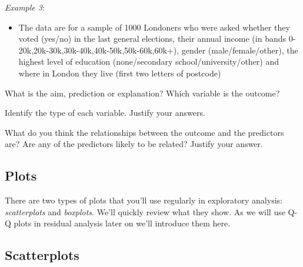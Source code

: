 \documentclass[
]{gitbook}
\providecommand{\tightlist}{%
  \setlength{\itemsep}{0pt}\setlength{\parskip}{0pt}}
\begin{document}
\newpage

\emph{Example 3}:

\begin{itemize}
\tightlist
\item
  The data are for a sample of 1000 Londoners who were asked whether they voted (yes/no) in the last general elections, their annual income (in bands 0-20k,20k-30k,30k-40k,40k-50k,50k-60k,60k+), gender (male/female/other), the highest level of education (none/secondary school/university/other) and where in London they live (first two letters of postcode)
\end{itemize}

What is the aim, prediction or explanation? Which variable is the outcome?


Identify the type of each variable. Justify your answers.


What do you think the relationships between the outcome and the predictors are? Are any of the predictors likely to be related? Justify your answer.

\newpage

\hypertarget{plots}{%
\subsection{Plots}\label{plots}}

There are two types of plots that you'll use regularly in exploratory analysis: \emph{scatterplots} and \emph{boxplots}. We'll quickly review what they show. As we will use Q-Q plots in residual analysis later on we'll introduce them here.

\hypertarget{scatterplots}{%
\subsection{Scatterplots}\label{scatterplots}}
\end{document}
